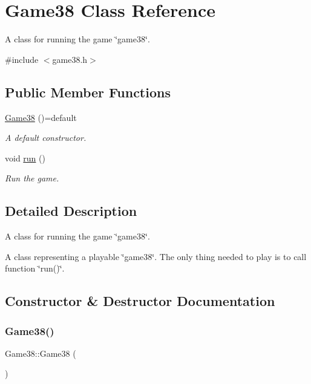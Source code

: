 \hypertarget{classGame38}{}\section{Game38 Class Reference}
\label{classGame38}


A class for running the game \char`\"{}game38\char`\"{}.  




{\ttfamily \#include $<$game38.\+h$>$}

\subsection*{Public Member Functions}
\begin{DoxyCompactItemize}
\item 
\hyperlink{classGame38_a6279a9c93ae21dead3ee6165c1afe04c}{Game38} ()=default
\begin{DoxyCompactList}\small\item\em A default constructor. \end{DoxyCompactList}\item 
void \hyperlink{classGame38_ab9e0b292923fbef270ab0cea6c59cf23}{run} ()
\begin{DoxyCompactList}\small\item\em Run the game. \end{DoxyCompactList}\end{DoxyCompactItemize}


\subsection{Detailed Description}
A class for running the game \char`\"{}game38\char`\"{}. 

A class representing a playable \char`\"{}game38\char`\"{}. The only thing needed to play is to call function \char`\"{}run()\char`\"{}. 

\subsection{Constructor \& Destructor Documentation}
\mbox{\label{classGame38_a6279a9c93ae21dead3ee6165c1afe04c}} 
\subsubsection{\texorpdfstring{Game38()}{Game38()}}
{\footnotesize\ttfamily Game38\+::\+Game38 (\begin{DoxyParamCaption}{ }\end{DoxyParamCaption})\hspace{0.3cm}{\ttfamily [default]}}



